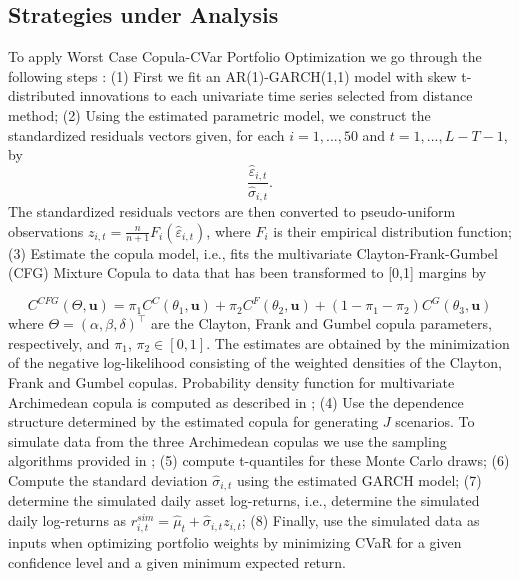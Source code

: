\documentclass[a4paper,10pt]{article}
\begin{document}
\subsection{Strategies under Analysis}

To apply Worst Case Copula-CVar Portfolio Optimization we go through the
following steps : (1) First we fit an AR(1)-GARCH(1,1) model with skew t-distributed
innovations to each univariate time series selected from distance method;
(2) Using the estimated parametric model, we construct the standardized
residuals vectors given, for each $i=1,...,50$ and $t=1,...,L-T-1$, by
\begin{equation*}
\frac{\widehat{\varepsilon }_{i,t}}{\widehat{\sigma }_{i,t}}.
\end{equation*}%
The standardized residuals vectors are then converted to pseudo-uniform
observations $z_{i,t}=\frac{n}{n+1}F_{i}\left( \widehat{\varepsilon }%
_{i,t}\right) $, where $F_{i}$ is their empirical distribution function; (3)
Estimate the copula model, i.e., fits the multivariate Clayton-Frank-Gumbel
(CFG) Mixture Copula to data that has been transformed to [0,1] margins by

\begin{equation}
C^{CFG}( \Theta ,\mathbf{u}) =\pi _{1}C^{C}( \theta _{1},\mathbf{u}) +\pi
_{2}C^{F}( \theta _{2},\mathbf{u}) +(1-\pi _{1}-\pi _{2}) C^{G}( \theta _{3},%
\mathbf{u})
\end{equation}
where $\Theta=\left(\alpha,\beta,\delta\right)^{\top }$ are the Clayton,
Frank and Gumbel copula parameters, respectively, and $\pi_{1}$, $\pi_{2}
\in [0,1]$. The estimates are obtained by the minimization of the negative
log-likelihood consisting of the weighted densities of the Clayton, Frank
and Gumbel copulas. Probability density function for multivariate
Archimedean copula is computed as described in \citet*{mcneil2009}; (4) Use
the dependence structure determined by the estimated copula for generating $%
J $ scenarios. To simulate data from the three Archimedean copulas we use
the sampling algorithms provided in \citet*{melchiori2006}; (5) compute
t-quantiles for these Monte Carlo draws; (6) Compute the standard deviation $%
\widehat{\sigma }_{i,t}$ using the estimated GARCH model; (7) determine the
simulated daily asset log-returns, i.e., determine the simulated daily
log-returns as $r_{i,t}^{sim}=\widehat{\mu }_{t}+\widehat{\sigma }%
_{i,t}z_{i,t}$; (8) Finally, use the simulated data as inputs when
optimizing portfolio weights by minimizing CVaR for a given confidence level
and a given minimum expected return.
\end{document}
